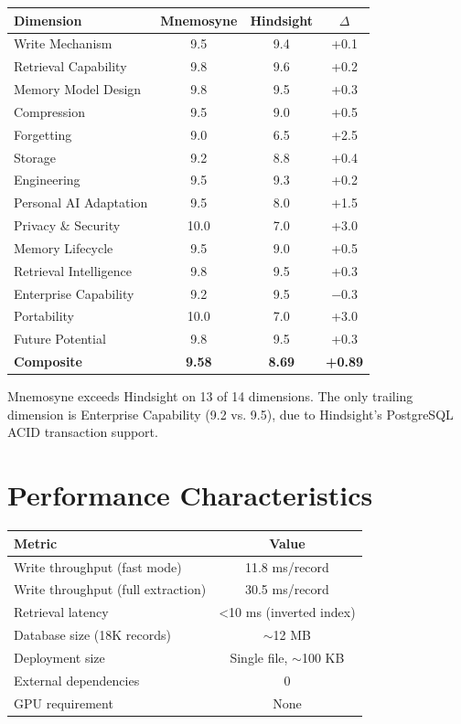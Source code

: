 \documentclass[11pt,a4paper]{article}
\begin{document}
\begin{table}[h]
\centering
\begin{tabular}{lccc}
\toprule
\textbf{Dimension} & \textbf{Mnemosyne} & \textbf{Hindsight} & \textbf{$\Delta$} \\
\midrule
Write Mechanism & 9.5 & 9.4 & +0.1 \\
Retrieval Capability & 9.8 & 9.6 & +0.2 \\
Memory Model Design & 9.8 & 9.5 & +0.3 \\
Compression & 9.5 & 9.0 & +0.5 \\
Forgetting & 9.0 & 6.5 & +2.5 \\
Storage & 9.2 & 8.8 & +0.4 \\
Engineering & 9.5 & 9.3 & +0.2 \\
Personal AI Adaptation & 9.5 & 8.0 & +1.5 \\
Privacy \& Security & 10.0 & 7.0 & +3.0 \\
Memory Lifecycle & 9.5 & 9.0 & +0.5 \\
Retrieval Intelligence & 9.8 & 9.5 & +0.3 \\
Enterprise Capability & 9.2 & 9.5 & $-0.3$ \\
Portability & 10.0 & 7.0 & +3.0 \\
Future Potential & 9.8 & 9.5 & +0.3 \\
\midrule
\textbf{Composite} & \textbf{9.58} & \textbf{8.69} & \textbf{+0.89} \\
\bottomrule
\end{tabular}
\end{table}

Mnemosyne exceeds Hindsight on 13 of 14 dimensions. The only trailing dimension is Enterprise Capability (9.2 vs. 9.5), due to Hindsight's PostgreSQL ACID transaction support.

\section{Performance Characteristics}

\begin{table}[h]
\centering
\begin{tabular}{lc}
\toprule
\textbf{Metric} & \textbf{Value} \\
\midrule
Write throughput (fast mode) & 11.8 ms/record \\
Write throughput (full extraction) & 30.5 ms/record \\
Retrieval latency & <10 ms (inverted index) \\
Database size (18K records) & $\sim$12 MB \\
Deployment size & Single file, $\sim$100 KB \\
External dependencies & 0 \\
GPU requirement & None \\
\bottomrule
\end{tabular}
\end{table}
\end{document}

